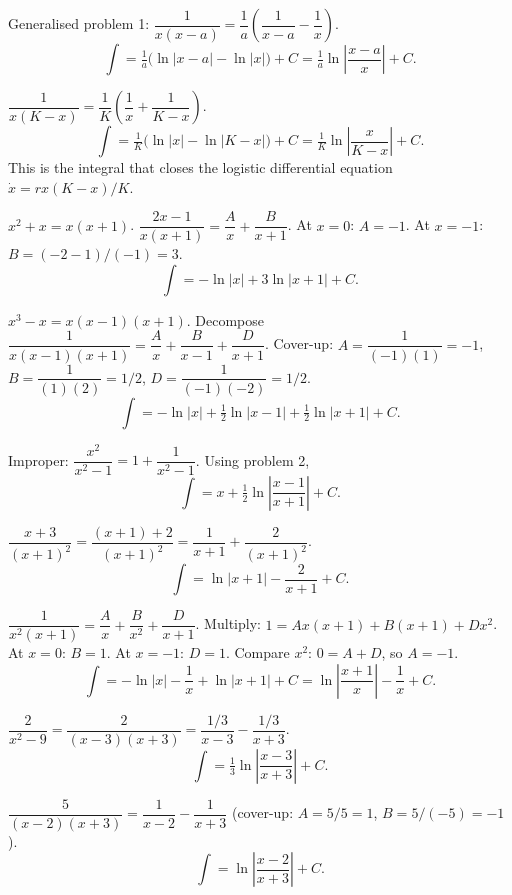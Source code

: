 \begin{solutions}
  \item Generalised problem 1:
        $\dfrac{1}{x(x-a)}=\dfrac1a\left(\dfrac{1}{x-a}-\dfrac1x\right)$.
        \[
          \int = \tfrac1a\bigl(\ln|x-a|-\ln|x|\bigr)+C
               = \tfrac1a\ln\left|\frac{x-a}{x}\right|+C .
        \]

  \item $\dfrac{1}{x(K-x)}=\dfrac1K\left(\dfrac1x+\dfrac{1}{K-x}\right)$.
        \[
          \int = \tfrac1K\bigl(\ln|x|-\ln|K-x|\bigr)+C
               = \tfrac1K\ln\left|\frac{x}{K-x}\right|+C .
        \]
        This is the integral that closes the logistic differential
        equation $\dot x=rx(K-x)/K$.

  \item $x^{2}+x=x(x+1)$. $\dfrac{2x-1}{x(x+1)}=\dfrac{A}{x}+\dfrac{B}{x+1}$.
        At $x=0$: $A=-1$. At $x=-1$: $B=(-2-1)/(-1)=3$.
        \[
          \int = -\ln|x|+3\ln|x+1|+C .
        \]

  \item $x^{3}-x=x(x-1)(x+1)$. Decompose
        $\dfrac{1}{x(x-1)(x+1)}=\dfrac{A}{x}+\dfrac{B}{x-1}+\dfrac{D}{x+1}$.
        Cover-up: $A=\dfrac{1}{(-1)(1)}=-1$, $B=\dfrac{1}{(1)(2)}=1/2$,
        $D=\dfrac{1}{(-1)(-2)}=1/2$.
        \[
          \int = -\ln|x|+\tfrac12\ln|x-1|+\tfrac12\ln|x+1|+C .
        \]

  \item Improper: $\dfrac{x^{2}}{x^{2}-1}=1+\dfrac{1}{x^{2}-1}$. Using
        problem 2,
        \[
          \int = x+\tfrac12\ln\left|\frac{x-1}{x+1}\right|+C .
        \]

  \item $\dfrac{x+3}{(x+1)^{2}}=\dfrac{(x+1)+2}{(x+1)^{2}}
        =\dfrac{1}{x+1}+\dfrac{2}{(x+1)^{2}}$.
        \[
          \int = \ln|x+1|-\frac{2}{x+1}+C .
        \]

  \item $\dfrac{1}{x^{2}(x+1)}=\dfrac{A}{x}+\dfrac{B}{x^{2}}+\dfrac{D}{x+1}$.
        Multiply: $1=Ax(x+1)+B(x+1)+Dx^{2}$. At $x=0$: $B=1$. At $x=-1$:
        $D=1$. Compare $x^{2}$: $0=A+D$, so $A=-1$.
        \[
          \int = -\ln|x|-\frac1x+\ln|x+1|+C
               = \ln\left|\frac{x+1}{x}\right|-\frac1x+C .
        \]

  \item $\dfrac{2}{x^{2}-9}=\dfrac{2}{(x-3)(x+3)}
        =\dfrac{1/3}{x-3}-\dfrac{1/3}{x+3}$.
        \[
          \int = \tfrac13\ln\left|\frac{x-3}{x+3}\right|+C .
        \]

  \item $\dfrac{5}{(x-2)(x+3)}=\dfrac{1}{x-2}-\dfrac{1}{x+3}$ (cover-up:
        $A=5/5=1$, $B=5/(-5)=-1$).
        \[
          \int = \ln\left|\frac{x-2}{x+3}\right|+C .
        \]


\end{solutions}
